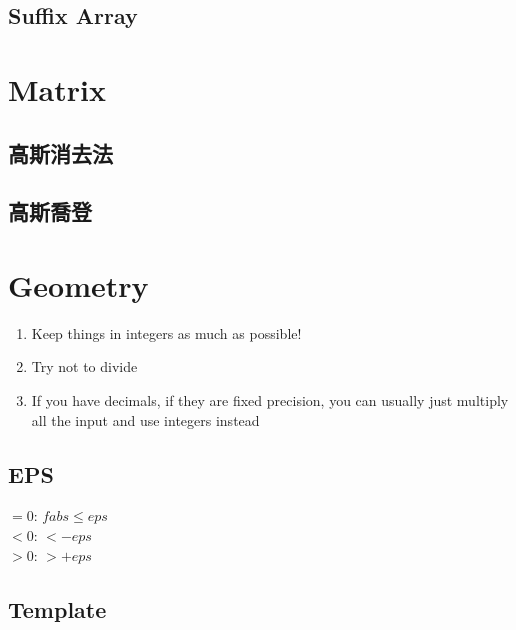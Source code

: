 \documentclass[10pt,oneside]{article}
\begin{document}
\begin{landscape}
\begin{multicols}{2}
\subsection{Suffix Array}

\section{Matrix}

\subsection{高斯消去法}

\subsection{高斯喬登}


\section{Geometry}

\begin{enumerate}
	\item Keep things in integers as much as possible!
	\item Try not to divide
	\item If you have decimals, if they are fixed precision, you can usually just multiply all the input and use integers instead
\end{enumerate}

\subsection{EPS}


$=0$: $fabs \leq eps$\\
$<0$: $ < -eps$\\
$>0$: $ > +eps$

\subsection{Template}

% 



\end{multicols}
\end{landscape}
\end{document}
